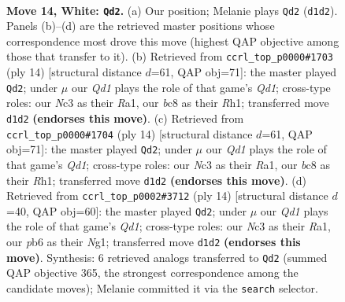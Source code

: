 \documentclass[11pt]{article}
\begin{document}
\begin{figure}[p]\centering
\begin{subfigure}{0.46\textwidth}\centering
\resizebox{\linewidth}{!}{%
\newchessgame
\chessboard[
  setfen={rnbqkbr1/5p2/1p1p1n2/p1pP4/P3P1pp/2N1BP2/RP4PP/3QKBNR w Kq - 0 14},
  showmover=false,
  pgfstyle=straightmove, color=movearrow, markmove={d1-d2}
]}
\caption{}
\end{subfigure}\hfill
\begin{subfigure}{0.46\textwidth}\centering
\resizebox{\linewidth}{!}{%
\newchessgame
\chessboard[
  setfen={rnbq1rk1/pp3pbp/3ppnp1/2pP4/2P1P3/2N1BP2/PP4PP/R2QKBNR w KQ - 0 8},
  showmover=false,
  pgfstyle=straightmove, color=movearrow, markmove={d1-d2}
]}
\caption{}
\end{subfigure}
\\[4pt]
\begin{subfigure}{0.46\textwidth}\centering
\resizebox{\linewidth}{!}{%
\newchessgame
\chessboard[
  setfen={rnbq1rk1/pp3pbp/3ppnp1/2pP4/2P1P3/2N1BP2/PP4PP/R2QKBNR w KQ - 0 8},
  showmover=false,
  pgfstyle=straightmove, color=movearrow, markmove={d1-d2}
]}
\caption{}
\end{subfigure}\hfill
\begin{subfigure}{0.46\textwidth}\centering
\resizebox{\linewidth}{!}{%
\newchessgame
\chessboard[
  setfen={rnbq1rk1/pp3pbp/2pp1np1/3Pp3/2P1P3/2N1BP2/PP4PP/R2QKBNR w KQ - 0 8},
  showmover=false,
  pgfstyle=straightmove, color=movearrow, markmove={d1-d2}
]}
\caption{}
\end{subfigure}
\caption{\textbf{Move 14, White: \texttt{Qd2}.} (a) Our position; Melanie plays \texttt{Qd2} (\texttt{d1d2}). Panels (b)--(d) are the retrieved master positions whose correspondence most drove this move (highest QAP objective among those that transfer to it). (b) Retrieved from \texttt{ccrl\_top\_p0000\#1703} (ply 14) [structural distance $d$=61, QAP obj=71]: the master played \texttt{Qd2}; under $\mu$ our \emph{Qd1} plays the role of that game's \emph{Qd1}; cross-type roles: our \emph{N}c3 as their \emph{R}a1, our \emph{b}c8 as their \emph{R}h1; transferred move \texttt{d1d2} \textbf{(endorses this move)}. (c) Retrieved from \texttt{ccrl\_top\_p0000\#1704} (ply 14) [structural distance $d$=61, QAP obj=71]: the master played \texttt{Qd2}; under $\mu$ our \emph{Qd1} plays the role of that game's \emph{Qd1}; cross-type roles: our \emph{N}c3 as their \emph{R}a1, our \emph{b}c8 as their \emph{R}h1; transferred move \texttt{d1d2} \textbf{(endorses this move)}. (d) Retrieved from \texttt{ccrl\_top\_p0002\#3712} (ply 14) [structural distance $d$=40, QAP obj=60]: the master played \texttt{Qd2}; under $\mu$ our \emph{Qd1} plays the role of that game's \emph{Qd1}; cross-type roles: our \emph{N}c3 as their \emph{R}a1, our \emph{p}b6 as their \emph{N}g1; transferred move \texttt{d1d2} \textbf{(endorses this move)}. Synthesis: 6 retrieved analogs transferred to \texttt{Qd2} (summed QAP objective 365, the strongest correspondence among the candidate moves); Melanie committed it via the \texttt{search} selector.}
\label{fig:thought-m26}
\end{figure}
\end{document}
